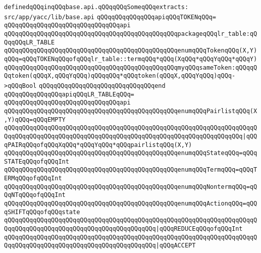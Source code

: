 \verb|definedqQQqinqQQqbase.api.qQQqqQQqSomeqQQqextracts:|\newline
\verb|src/app/yacc/lib/base.api|\newline
\newline
\verb|qQQqqQQqqQQqqQQqapiqQQqTOKENqQQq=|\newline
\verb|qQQqqQQqqQQqqQQqqQQqqQQqqQQqqQQqapi|\newline
\verb|qQQqqQQqqQQqqQQqqQQqqQQqqQQqqQQqqQQqqQQqqQQqqQQqpackageqQQqlr_table:qQQqqQQqLR_TABLE|\newline
\verb|qQQqqQQqqQQqqQQqqQQqqQQqqQQqqQQqqQQqqQQqqQQqqQQqenumqQQqTokenqQQq(X,Y)qQQq=qQQqTOKENqQQqofqQQqlr_table::termqQQq*qQQq(XqQQq*qQQqYqQQq*qQQqY)|\newline
\verb|qQQqqQQqqQQqqQQqqQQqqQQqqQQqqQQqqQQqqQQqqQQqqQQqmyqQQqsameToken:qQQqqQQqtoken(qQQqX,qQQqYqQQq)qQQqqQQq*qQQqtoken(qQQqX,qQQqYqQQq)qQQq->qQQqBool|\newline
\verb|qQQqqQQqqQQqqQQqqQQqqQQqqQQqqQQqend|\newline
\newline
\verb|qQQqqQQqqQQqqQQqapiqQQqLR_TABLEqQQq=|\newline
\verb|qQQqqQQqqQQqqQQqqQQqqQQqqQQqqQQqapi|\newline
\verb|qQQqqQQqqQQqqQQqqQQqqQQqqQQqqQQqqQQqqQQqqQQqqQQqenumqQQqPairlistqQQq(X,Y)qQQq=qQQqEMPTY|\newline
\verb|qQQqqQQqqQQqqQQqqQQqqQQqqQQqqQQqqQQqqQQqqQQqqQQqqQQqqQQqqQQqqQQqqQQqqQQqqQQqqQQqqQQqqQQqqQQqqQQqqQQqqQQqqQQqqQQqqQQqqQQqqQQqqQQqqQQqqQQq|\verb#|qQQqPAIRqQQqofqQQqXqQQq*qQQqYqQQq*qQQqpairlistqQQq(X,Y)#\newline
\newline
\verb|qQQqqQQqqQQqqQQqqQQqqQQqqQQqqQQqqQQqqQQqqQQqqQQqenumqQQqStateqQQq=qQQqSTATEqQQqofqQQqInt|\newline
\verb|qQQqqQQqqQQqqQQqqQQqqQQqqQQqqQQqqQQqqQQqqQQqqQQqenumqQQqTermqQQq=qQQqTERMqQQqofqQQqInt|\newline
\verb|qQQqqQQqqQQqqQQqqQQqqQQqqQQqqQQqqQQqqQQqqQQqqQQqenumqQQqNontermqQQq=qQQqNTqQQqofqQQqInt|\newline
\verb|qQQqqQQqqQQqqQQqqQQqqQQqqQQqqQQqqQQqqQQqqQQqqQQqenumqQQqActionqQQq=qQQqSHIFTqQQqofqQQqstate|\newline
\verb|qQQqqQQqqQQqqQQqqQQqqQQqqQQqqQQqqQQqqQQqqQQqqQQqqQQqqQQqqQQqqQQqqQQqqQQqqQQqqQQqqQQqqQQqqQQqqQQqqQQqqQQqqQQqqQQq|\verb#|qQQqREDUCEqQQqofqQQqInt#\newline
\verb|qQQqqQQqqQQqqQQqqQQqqQQqqQQqqQQqqQQqqQQqqQQqqQQqqQQqqQQqqQQqqQQqqQQqqQQqqQQqqQQqqQQqqQQqqQQqqQQqqQQqqQQqqQQqqQQq|\verb#|qQQqACCEPT#\newline
